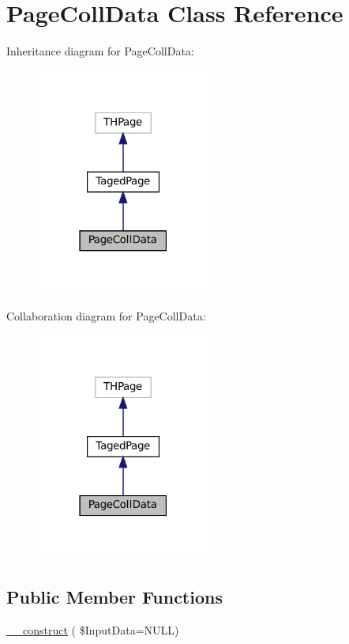 \hypertarget{class_page_coll_data}{}\section{Page\+Coll\+Data Class Reference}
\label{class_page_coll_data}


Inheritance diagram for Page\+Coll\+Data\+:\nopagebreak
\begin{figure}[H]
\begin{center}
\leavevmode
\includegraphics[width=162pt]{class_page_coll_data__inherit__graph}
\end{center}
\end{figure}


Collaboration diagram for Page\+Coll\+Data\+:\nopagebreak
\begin{figure}[H]
\begin{center}
\leavevmode
\includegraphics[width=162pt]{class_page_coll_data__coll__graph}
\end{center}
\end{figure}
\subsection*{Public Member Functions}
\begin{DoxyCompactItemize}
\item 
\hyperlink{class_page_coll_data_a4bb7eb0355f3cc6d73bcf76345174cc4}{\+\_\+\+\_\+construct} ( \$Input\+Data=N\+U\+LL)
\end{DoxyCompactItemize}
